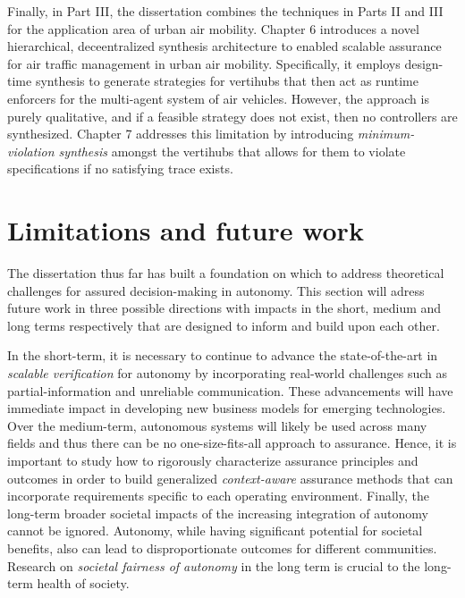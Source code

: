 Finally, in Part III, the dissertation combines the techniques in Parts II and III for the application area of urban air mobility. Chapter 6 introduces a novel hierarchical, deceentralized synthesis architecture to enabled scalable assurance for air traffic management in urban air mobility. Specifically, it employs design-time synthesis to generate strategies for vertihubs that then act as runtime enforcers for the multi-agent system of air vehicles. However, the approach is purely qualitative, and if a feasible strategy does not exist, then no controllers are synthesized. Chapter 7 addresses this limitation by introducing \emph{minimum-violation synthesis} amongst the vertihubs that allows for them to violate specifications if no satisfying trace exists. 

\section{Limitations and future work}
The dissertation thus far has  built a foundation on which to address theoretical challenges for assured decision-making in autonomy. This section will adress future work in three possible directions with impacts in the short, medium and long terms respectively that are designed to inform and build upon each other. 

In the short-term, it is necessary to continue to advance the state-of-the-art in \emph{scalable verification} for autonomy by incorporating real-world challenges such as partial-information and unreliable communication. These advancements will have immediate impact in developing new business models for emerging technologies. Over the medium-term, autonomous systems will likely be used across many fields and thus there can be no one-size-fits-all approach to assurance.  Hence, it is important to study how to rigorously characterize assurance principles and outcomes in order to build generalized \emph{context-aware} assurance methods that can incorporate requirements specific to each operating environment. Finally, the long-term broader societal impacts of the increasing integration of autonomy cannot be ignored. Autonomy, while having significant potential for societal benefits, also can lead to disproportionate outcomes for different communities. Research on \emph{societal fairness of autonomy} in the long term is crucial to the long-term health of society.

